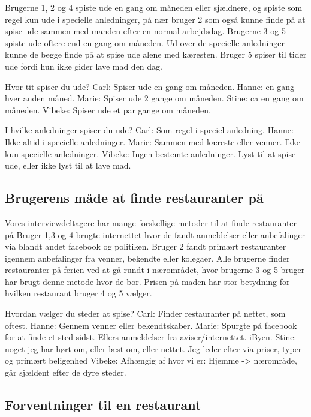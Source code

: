 \documentclass[a4paper, 12pt]{article}
\begin{document}
Brugerne 1, 2 og 4 spiste ude en gang om måneden eller sjældnere, og spiste som regel
kun ude i specielle anledninger, på nær bruger 2 som også kunne finde på at spise ude
sammen med manden efter en normal arbejdsdag.
Brugerne 3 og 5 spiste ude oftere end en gang om måneden. Ud over de specielle anledninger
kunne de begge finde på at spise ude alene med kæresten. Bruger 5 spiser til tider ude
fordi hun ikke gider lave mad den dag.

  Hvor tit spiser du ude?
    Carl: Spiser ude en gang om måneden.
    Hanne: en gang hver anden måned.
    Marie: Spiser ude 2 gange om måneden.
    Stine: ca en gang om måneden.
    Vibeke: Spiser ude et par gange om måneden.

  I hvilke anledninger spiser du ude?
    Carl: Som regel i speciel anledning.
    Hanne: Ikke altid i specielle anledninger.
    Marie: Sammen med kæreste eller venner. Ikke kun specielle anledninger.
    Vibeke: Ingen bestemte anledninger. Lyst til at spise ude, eller ikke lyst til at lave mad.

\subsection{Brugerens måde at finde restauranter på}

Vores interviewdeltagere har mange forskellige metoder til at finde restauranter på
Bruger 1,3 og 4 brugte internettet hvor de fandt anmeldelser eller anbefalinger via
blandt andet facebook og politiken. Bruger 2 fandt primært restauranter igennem 
anbefalinger fra venner, bekendte eller kolegaer. Alle brugerne finder restauranter
på ferien ved at gå rundt i nærområdet, hvor brugerne 3 og 5 bruger har brugt denne
metode hvor de bor. Prisen på maden har stor betydning for hvilken restaurant bruger
4 og 5 vælger.

  Hvordan vælger du steder at spise?
    Carl: Finder restauranter på nettet, som oftest.
    Hanne: Gennem venner eller bekendtskaber.
    Marie: Spurgte på facebook for at finde et sted sidst. Ellers anmeldelser fra aviser/internettet. iByen.
    Stine: noget jeg har hørt om, eller læst om, eller nettet. Jeg leder efter via priser, typer og primært beligenhed
    Vibeke: Afhængig af hvor vi er: Hjemme -> nærområde, går sjældent efter de dyre steder.

\subsection{Forventninger til en restaurant}
\end{document}
